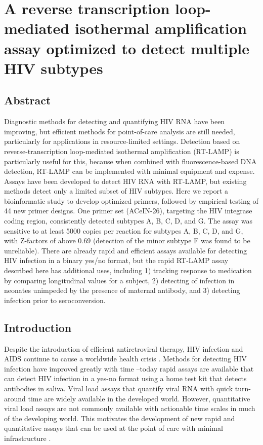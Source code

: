 \documentclass[../sherrill-Mix_thesis.tex]{subfiles}
\begin{document}
\graphicspath{{im/}{lamp/im/}}

\chapter{A reverse transcription loop-mediated isothermal amplification assay optimized to detect multiple HIV subtypes}

\section{Abstract}

	Diagnostic methods for detecting and quantifying HIV RNA have been improving, but efficient methods for point-of-care analysis are still needed, particularly for applications in resource-limited settings. Detection based on reverse-transcription loop-mediated isothermal amplification (RT-LAMP) is particularly useful for this, because when combined with fluorescence-based DNA detection, RT-LAMP can be implemented with minimal equipment and expense. Assays have been developed to detect HIV RNA with RT-LAMP, but existing methods detect only a limited subset of HIV subtypes. Here we report a bioinformatic study to develop optimized primers, followed by empirical testing of 44 new primer designs. One primer set (ACeIN-26), targeting the HIV integrase coding region, consistently detected subtypes A, B, C, D, and G. The assay was sensitive to at least 5000 copies per reaction for subtypes A, B, C, D, and G, with Z-factors of above 0.69 (detection of the minor subtype F was found to be unreliable). There are already rapid and efficient assays available for detecting HIV infection in a binary yes/no format, but the rapid RT-LAMP assay described here has additional uses, including 1) tracking response to medication by comparing longitudinal values for a subject, 2) detecting of infection in neonates unimpeded by the presence of maternal antibody, and 3) detecting infection prior to seroconversion.

\section{Introduction}
	Despite the introduction of efficient antiretroviral therapy, HIV infection and AIDS continue to cause a worldwide health crisis \citep{Murray2014}. Methods for detecting HIV infection have improved greatly with time \citep{Sollis2014}--today rapid assays are available that can detect HIV infection in a yes-no format using a home test kit that detects antibodies in saliva. Viral load assays that quantify viral RNA with quick turn-around time are widely available in the developed world. However, quantitative viral load assays are not commonly available with actionable time scales in much of the developing world. This motivates the development of new rapid and quantitative assays that can be used at the point of care with minimal infrastructure \citep{Liu2013,Curtis2012}.
\end{document}
